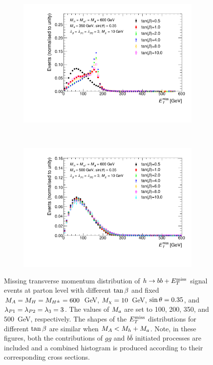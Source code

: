 \begin{figure}[tbp]
\begin{subfigure}{0.48\textwidth}
\end{subfigure}
\\
\centering
\begin{subfigure}{0.48\textwidth}
\includegraphics[width = \textwidth]{texinputs/04_grid/figures/monoHbb_tanb_scan_MA600_Ma350_MET_liny_norm2one.pdf}
\end{subfigure}
~
\begin{subfigure}{0.48\textwidth}
\includegraphics[width = \textwidth]{texinputs/04_grid/figures/monoHbb_tanb_scan_MA600_Ma500_MET_liny_norm2one.pdf}
\end{subfigure}
\caption[$\MET$ distribution in $h\rightarrow bb + \MET$ events for different 
$\tanb$ for $\mA = \mH = \mHc = 600 $ GeV]
{
Missing transverse momentum distribution of $h\rightarrow bb + \MET$ signal 
events at parton level with different $\tanb$ and
 fixed $\mA = \mH = \mHc = 600 $~GeV, $ M_{\chi} = 10$~GeV, $\sin\theta = 0.35$, 
and $ \lambda_{P1} = \lambda_{P2} = \lambda_{3} = 3 $. The values of $M_{a}$ are set to 100, 200, 
350, and 500~GeV, respectively.
The shapes of the $\MET$ distributions for different $\tanb$ are similar when 
$M_{A} < M_{h}+M_{a}$. Note, in these figures, both the contributions of $gg$ and $b\bar{b}$ 
initiated processes are included and a combined histogram is produced 
according to their corresponding cross sections.
}
\label{fig:monoHbb_tanb_scan_met}
\end{figure}



